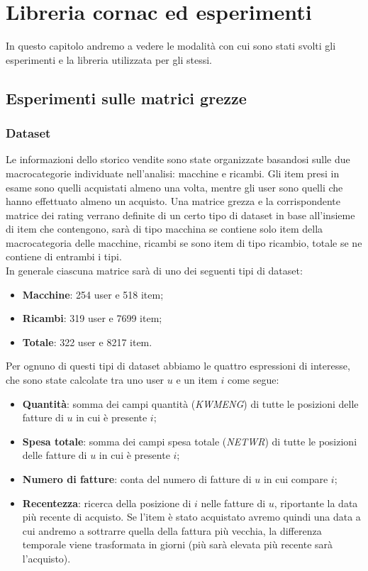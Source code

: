 \hypertarget{(chap:capitolo6)}{}
\chapter{Libreria cornac ed esperimenti}
In questo capitolo andremo a vedere le modalità con cui sono stati svolti gli esperimenti e la libreria utilizzata per gli stessi.
\section{Esperimenti sulle matrici grezze}
\subsection{Dataset}
Le informazioni dello storico vendite sono state organizzate basandosi sulle due macrocategorie individuate nell'analisi: macchine e ricambi.
Gli item presi in esame sono quelli acquistati almeno una volta, mentre gli user sono quelli che hanno effettuato almeno un acquisto.
Una matrice grezza e la corrispondente matrice dei rating verrano definite di un certo tipo di dataset in base all'insieme di item che contengono, sarà di tipo macchina se contiene solo item della macrocategoria delle macchine, ricambi se sono item di tipo ricambio, totale se ne contiene di entrambi i tipi.\\
In generale ciascuna matrice sarà di uno dei seguenti tipi di dataset:

\begin{itemize}
    \item \textbf{Macchine}: 254 user e 518 item;
    \item \textbf{Ricambi}: 319 user e 7699 item;
    \item \textbf{Totale}: 322 user e 8217 item.
\end{itemize}

Per ognuno di questi tipi di dataset abbiamo le quattro espressioni di interesse, che sono state calcolate tra uno user $u$ e un item $i$ come segue:
\begin{itemize}
    \item \textbf{Quantità}: somma dei campi quantità (\textit{KWMENG}) di tutte le posizioni delle fatture di $u$ in cui è presente $i$;
    \item \textbf{Spesa totale}: somma dei campi spesa totale (\textit{NETWR}) di tutte le posizioni delle fatture di $u$ in cui è presente $i$;
    \item \textbf{Numero di fatture}: conta del numero di fatture di $u$ in cui compare $i$;
    \item \textbf{Recentezza}: ricerca della posizione di $i$ nelle fatture di $u$, riportante la data più recente di acquisto. Se l'item è stato acquistato avremo quindi una data a cui andremo a sottrarre quella della fattura più vecchia, la differenza temporale viene trasformata in giorni (più sarà elevata più recente sarà l'acquisto).
\end{itemize}

